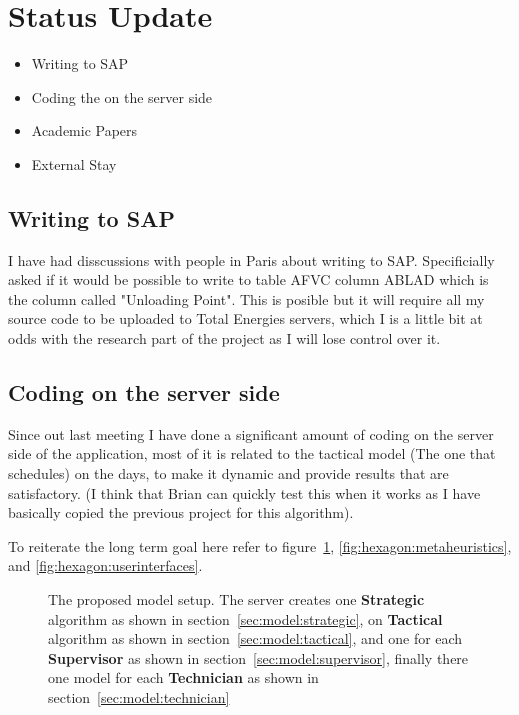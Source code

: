 \section{Status Update}

\begin{itemize}
	\item Writing to SAP
	\item Coding the on the server side
	\item Academic Papers
	\item External Stay
\end{itemize}

\subsection{Writing to SAP}
I have had disscussions with people in Paris about writing to SAP. Specificially 
asked if it would be possible to write to table AFVC column ABLAD which is the 
column called "Unloading Point". This is posible but it will require all
my source code to be uploaded to Total Energies servers, which I is a little 
bit at odds with the research part of the project as I will lose control over it.

\subsection{Coding on the server side}
Since out last meeting I have done a significant amount of coding on the server side
of the application, most of it is related to the tactical model (The one that schedules)
on the days, to make it dynamic and provide results that are satisfactory. (I think that
Brian can quickly test this when it works as I have basically copied the previous project
for this algorithm).

To reiterate the long term goal here refer to figure~\ref{fig:hexagon:persistence}, \ref{fig:hexagon:metaheuristics}, and \ref{fig:hexagon:userinterfaces}. 


\begin{figure}[H]
	\centering
    \drawModelSetupHexagon[userinterface=false, persistence=true, metaheuristics=false]
	\caption{The proposed model setup. The server creates one \textbf{Strategic} algorithm as shown in section~\ref{sec:model:strategic}, 
	on \textbf{Tactical} algorithm as shown in section~\ref{sec:model:tactical}, and 
	one for each \textbf{Supervisor} as shown in section~\ref{sec:model:supervisor}, 
	finally there one model for each \textbf{Technician} as shown in section~\ref{sec:model:technician}}
	\label{fig:hexagon:persistence}
\end{figure}

